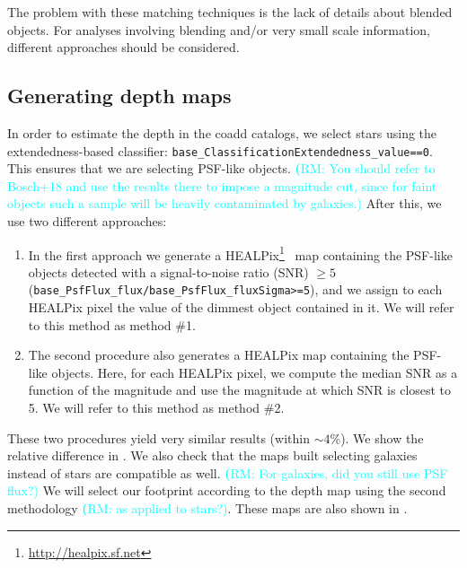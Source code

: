 \documentclass[twocolumn]{aastex62}
\newcommand{\rachel}[1]{{\textcolor{cyan}{{\textbf (RM: #1)}}}}
\begin{document}
The problem with these matching techniques is the lack of details about blended objects. For analyses involving blending and/or very small scale information, different approaches should be considered.


\subsection{Generating depth maps}
\label{sec:masking}

In order to estimate the depth in the coadd catalogs, we select stars using the extendedness-based classifier: \texttt{base\_ClassificationExtendedness\_value==0}. This ensures that we are selecting
PSF-like objects. \rachel{You should  refer to Bosch+18 and use the results there to impose a magnitude cut, since for faint objects such a sample will be heavily contaminated by galaxies.} After this, we use two different approaches:

\begin{enumerate}
\item In the first approach we generate a HEALPix\footnote{\url{http://healpix.sf.net}}~\citep{2005ApJ...622..759G} map containing the PSF-like objects detected with a signal-to-noise ratio (SNR) $\geq 5$ (\texttt{base\_PsfFlux\_flux/base\_PsfFlux\_fluxSigma>=5}), and we assign to each HEALPix pixel the value of the
dimmest object contained in it. We will refer to this method as method \#1.
\item The second procedure also generates a HEALPix map containing the PSF-like objects. Here, for each HEALPix pixel, we compute the median SNR as a function of the magnitude and use the magnitude at which SNR is closest to 5. We will refer to this method as method \#2.
\end{enumerate}

These two procedures yield very similar results (within $\sim 4\%$). We show the relative difference in . We also check that the maps built selecting galaxies instead of stars are compatible as well. \rachel{For galaxies, did you still use PSF flux?} We will select our footprint according to the depth map using the second methodology \rachel{as applied to stars?}. These maps are also shown in .
\end{document}
